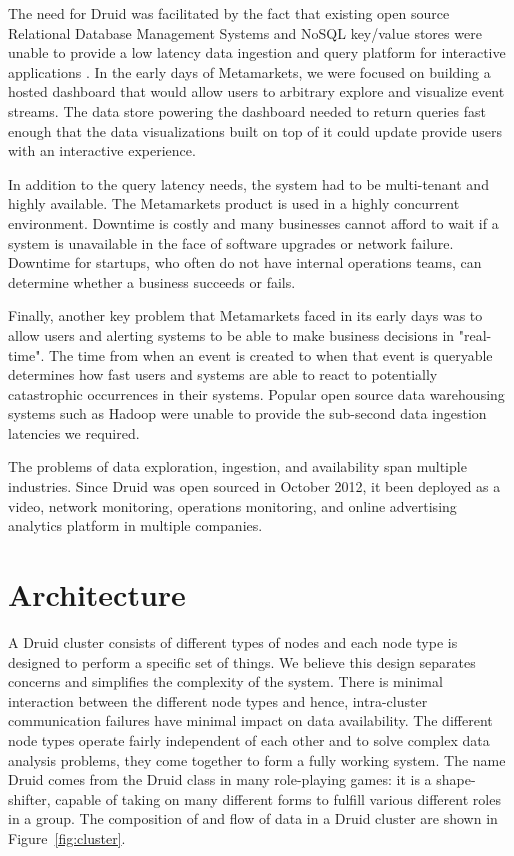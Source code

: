 \documentclass{acm_proc_article-sp}
\begin{document}
The need for Druid was facilitated by the fact that existing open source
Relational Database Management Systems and NoSQL key/value stores were unable
to provide a low latency data ingestion and query platform for interactive
applications \cite{tschetter2011druid}. In the early days of Metamarkets, we
were focused on building a hosted dashboard that would allow users to arbitrary
explore and visualize event streams.  The data store powering the dashboard
needed to return queries fast enough that the data visualizations built on top
of it could update provide users with an interactive experience. 

In addition to the query latency needs, the system had to be multi-tenant and
highly available. The Metamarkets product is used in a highly concurrent
environment. Downtime is costly and many businesses cannot afford to wait if a
system is unavailable in the face of software upgrades or network failure.
Downtime for startups, who often do not have internal operations teams, can
determine whether a business succeeds or fails.  

Finally, another key problem that Metamarkets faced in its early days was to
allow users and alerting systems to be able to make business decisions in
"real-time". The time from when an event is created to when that
event is queryable determines how fast users and systems are able to react to
potentially catastrophic occurrences in their systems. Popular open source data
warehousing systems such as Hadoop were unable to provide the sub-second data ingestion
latencies we required. 

The problems of data exploration, ingestion, and availability span multiple
industries. Since Druid was open sourced in October 2012, it been deployed as a
video, network monitoring, operations monitoring, and online advertising
analytics platform in multiple companies.

\section{Architecture}
\label{sec:architecture}
A Druid cluster consists of different types of nodes and each node type is
designed to perform a specific set of things. We believe this design separates
concerns and simplifies the complexity of the system.  There is minimal
interaction between the different node types and hence, intra-cluster
communication failures have minimal impact on data availability.  The different
node types operate fairly independent of each other and to solve complex data
analysis problems, they come together to form a fully working system.
The name Druid comes from the Druid class in many role-playing games: it is a
shape-shifter, capable of taking on many different forms to fulfill various
different roles in a group.  The composition of and flow of data in a Druid
cluster are shown in Figure~\ref{fig:cluster}.
\end{document}
